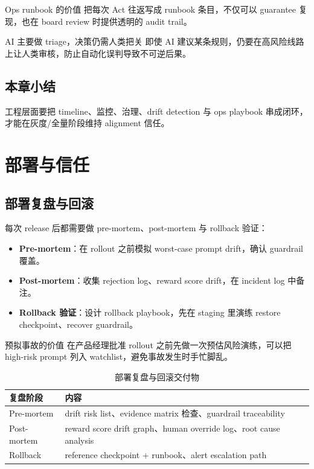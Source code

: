 \documentclass[a4paper]{article}
\begin{document}
\begin{knowledgebox}{Ops runbook 的价值}
把每次 Act 往返写成 runbook 条目，不仅可以 guarantee 复现，也在 board review 时提供透明的 audit trail。
\end{knowledgebox}

\begin{warningbox}{AI 主要做 triage，决策仍需人类把关}
即使 AI 建议某条规则，仍要在高风险线路上让人类审核，防止自动化误判导致不可逆后果。
\end{warningbox}

\subsection{本章小结}

工程层面要把 timeline、监控、治理、drift detection 与 ops playbook 串成闭环，才能在灰度/全量阶段维持 alignment 信任。

\section{部署与信任}

\subsection{部署复盘与回滚}

每次 release 后都需要做 pre-mortem、post-mortem 与 rollback 验证：
\begin{itemize}
    \item \textbf{Pre-mortem}：在 rollout 之前模拟 worst-case prompt drift，确认 guardrail 覆盖。
    \item \textbf{Post-mortem}：收集 rejection log、reward score drift，在 incident log 中备注。
    \item \textbf{Rollback 验证}：设计 rollback playbook，先在 staging 里演练 restore checkpoint、recover guardrail。
\end{itemize}

\begin{importantbox}{预拟事故的价值}
在产品经理批准 rollout 之前先做一次预估风险演练，可以把 high-risk prompt 列入 watchlist，避免事故发生时手忙脚乱。
\end{importantbox}

\begin{table}[H]
\centering
\begin{tabular}{p{} p{}}
\toprule
复盘阶段 & 内容 \\
\midrule
Pre-mortem & drift risk list、evidence matrix 检查、guardrail traceability \\
Post-mortem & reward score drift graph、human override log、root cause analysis \\
Rollback & reference checkpoint + runbook、alert escalation path \\
\bottomrule
\end{tabular}
\caption{部署复盘与回滚交付物}
\end{table}
\end{document}
